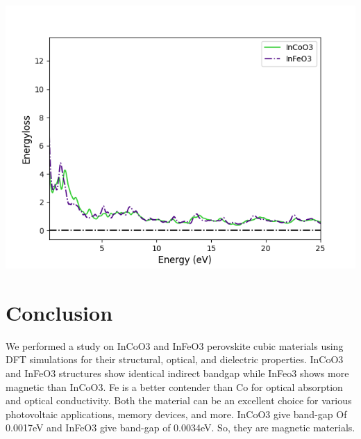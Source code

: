 \documentclass[12pt, letterpaper]{article}
\newcommand*{\1}{\hspace{1pt}}
\begin{document}
    \begin{adjustbox}{center,caption={Energyloss spectrum of InCoO3 and InFeO3},label={somelabel},nofloat=figure,}
        \includegraphics[width=\textwidth]{enloss}
    \end{adjustbox}

    \section{Conclusion}
    We performed a study on  InCoO3 and InFeO3\cite{r2} perovskite cubic materials using  DFT simulations for their structural, optical, and dielectric properties. InCoO3
    and InFeO3 structures show identical indirect bandgap while InFeo3 shows more magnetic than InCoO3. Fe is a better contender than Co for optical absorption 
    and optical conductivity. Both the material can be an excellent choice for various photovoltaic applications, memory devices, and more. InCoO3 give band-gap Of
    0.0017eV and InFeO3 give band-gap of 0.0034eV. So, they are magnetic materials.
    
    
    
    
\end{document}
